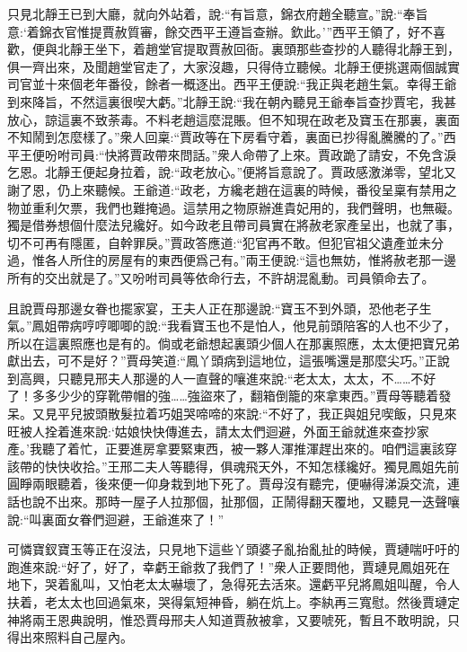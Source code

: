 \begin{parag}
    只見北靜王已到大廳，就向外站着，說:“有旨意，錦衣府趙全聽宣。”說:“奉旨意:‘着錦衣官惟提賈赦質審，餘交西平王遵旨查辦。欽此。’”西平王領了，好不喜歡，便與北靜王坐下，着趙堂官提取賈赦回衙。裏頭那些查抄的人聽得北靜王到，俱一齊出來，及聞趙堂官走了，大家沒趣，只得侍立聽候。北靜王便挑選兩個誠實司官並十來個老年番役，餘者一概逐出。西平王便說:“我正與老趙生氣。幸得王爺到來降旨，不然這裏很喫大虧。”北靜王說:“我在朝內聽見王爺奉旨查抄賈宅，我甚放心，諒這裏不致荼毒。不料老趙這麼混賬。但不知現在政老及寶玉在那裏，裏面不知鬧到怎麼樣了。”衆人回稟:“賈政等在下房看守着，裏面已抄得亂騰騰的了。”西平王便吩咐司員:“快將賈政帶來問話。”衆人命帶了上來。賈政跪了請安，不免含淚乞恩。北靜王便起身拉着，說:“政老放心。”便將旨意說了。賈政感激涕零，望北又謝了恩，仍上來聽候。王爺道:“政老，方纔老趙在這裏的時候，番役呈稟有禁用之物並重利欠票，我們也難掩過。這禁用之物原辦進貴妃用的，我們聲明，也無礙。獨是借券想個什麼法兒纔好。如今政老且帶司員實在將赦老家產呈出，也就了事，切不可再有隱匿，自幹罪戾。”賈政答應道:“犯官再不敢。但犯官祖父遺產並未分過，惟各人所住的房屋有的東西便爲己有。”兩王便說:“這也無妨，惟將赦老那一邊所有的交出就是了。”又吩咐司員等依命行去，不許胡混亂動。司員領命去了。
\end{parag}


\begin{parag}
    且說賈母那邊女眷也擺家宴，王夫人正在那邊說:“寶玉不到外頭，恐他老子生氣。”鳳姐帶病哼哼唧唧的說:“我看寶玉也不是怕人，他見前頭陪客的人也不少了，所以在這裏照應也是有的。倘或老爺想起裏頭少個人在那裏照應，太太便把寶兄弟獻出去，可不是好？”賈母笑道:“鳳丫頭病到這地位，這張嘴還是那麼尖巧。”正說到高興，只聽見邢夫人那邊的人一直聲的嚷進來說:“老太太，太太，不……不好了！多多少少的穿靴帶帽的強……強盜來了，翻箱倒籠的來拿東西。”賈母等聽着發呆。又見平兒披頭散髮拉着巧姐哭啼啼的來說:“不好了，我正與姐兒喫飯，只見來旺被人拴着進來說:‘姑娘快快傳進去，請太太們迴避，外面王爺就進來查抄家產。’我聽了着忙，正要進房拿要緊東西，被一夥人渾推渾趕出來的。咱們這裏該穿該帶的快快收拾。”王邢二夫人等聽得，俱魂飛天外，不知怎樣纔好。獨見鳳姐先前圓睜兩眼聽着，後來便一仰身栽到地下死了。賈母沒有聽完，便嚇得涕淚交流，連話也說不出來。那時一屋子人拉那個，扯那個，正鬧得翻天覆地，又聽見一迭聲嚷說:“叫裏面女眷們迴避，王爺進來了！”
\end{parag}


\begin{parag}
    可憐寶釵寶玉等正在沒法，只見地下這些丫頭婆子亂抬亂扯的時候，賈璉喘吁吁的跑進來說:“好了，好了，幸虧王爺救了我們了！”衆人正要問他，賈璉見鳳姐死在地下，哭着亂叫，又怕老太太嚇壞了，急得死去活來。還虧平兒將鳳姐叫醒，令人扶着，老太太也回過氣來，哭得氣短神昏，躺在炕上。李紈再三寬慰。然後賈璉定神將兩王恩典說明，惟恐賈母邢夫人知道賈赦被拿，又要唬死，暫且不敢明說，只得出來照料自己屋內。
\end{parag}


